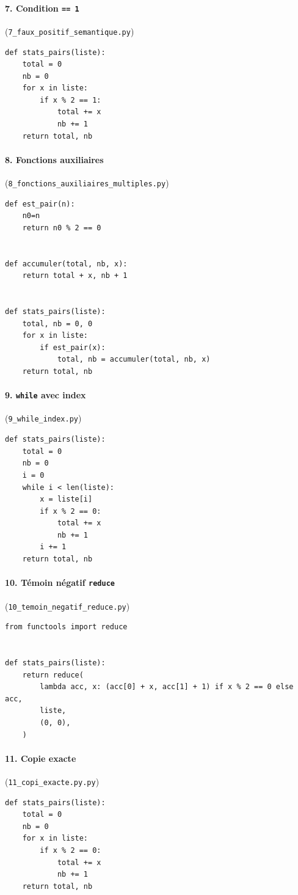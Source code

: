 \documentclass[12pt,a4paper,oneside]{report}
\begin{document}
\paragraph{7. Condition \texttt{== 1}} (\texttt{7\_faux\_positif\_semantique.py})
\begin{lstlisting}[style=pyncst]
def stats_pairs(liste):
    total = 0
    nb = 0
    for x in liste:
        if x % 2 == 1:
            total += x
            nb += 1
    return total, nb
\end{lstlisting}

\paragraph{8. Fonctions auxiliaires} (\texttt{8\_fonctions\_auxiliaires\_multiples.py})
\begin{lstlisting}[style=pyncst]
def est_pair(n):
    n0=n
    return n0 % 2 == 0


def accumuler(total, nb, x):
    return total + x, nb + 1


def stats_pairs(liste):
    total, nb = 0, 0
    for x in liste:
        if est_pair(x):
            total, nb = accumuler(total, nb, x)
    return total, nb
\end{lstlisting}

\paragraph{9. \texttt{while} avec index} (\texttt{9\_while\_index.py})
\begin{lstlisting}[style=pyncst]
def stats_pairs(liste):
    total = 0
    nb = 0
    i = 0
    while i < len(liste):
        x = liste[i]
        if x % 2 == 0:
            total += x
            nb += 1
        i += 1
    return total, nb
\end{lstlisting}

\paragraph{10. Témoin négatif \texttt{reduce}} (\texttt{10\_temoin\_negatif\_reduce.py})
\begin{lstlisting}[style=pyncst]
from functools import reduce


def stats_pairs(liste):
    return reduce(
        lambda acc, x: (acc[0] + x, acc[1] + 1) if x % 2 == 0 else acc,
        liste,
        (0, 0),
    )
\end{lstlisting}

\paragraph{11. Copie exacte} (\texttt{11\_copi\_exacte.py.py})
\begin{lstlisting}[style=pyncst]
def stats_pairs(liste):
    total = 0
    nb = 0
    for x in liste:
        if x % 2 == 0:
            total += x
            nb += 1
    return total, nb
\end{lstlisting}
\end{document}
